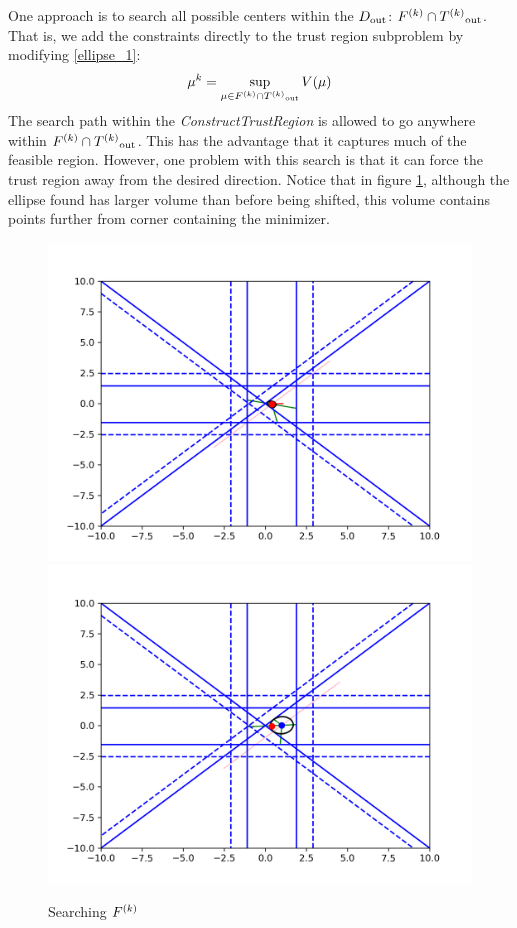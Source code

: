 One approach is to search all possible centers within the $ D_{\text{out}} $:
$ {F}^{(k)} \cap {T^{(k)}}_{\text{out}}$.
That is, we add the constraints directly to the trust region subproblem by modifying \ref{ellipse_1}:
$$\mu^k = \sup_{\mu \in {F}^{(k)} \cap {T^{(k)}}_{\text{out}}} V(\mu)$$
The search path within the \emph{ConstructTrustRegion} is allowed to go anywhere within $ {F}^{(k)} \cap {T^{(k)}}_{\text{out}}$.
This has the advantage that it captures much of the feasible region.
However, one problem with this search is that it can force the trust region away from the desired direction.
Notice that in figure \ref{ellipse_runs_away}, although the ellipse found has larger volume than before being shifted, this volume contains points further from corner containing the minimizer.

\begin{figure}[h]
    \centering
    \includegraphics[scale=0.4]{images/everything_runs_1.png}
    \includegraphics[scale=0.4]{images/everything_runs_2.png}
    \caption{Searching ${F}^{(k)}$}
    \label{ellipse_runs_away}
\end{figure}


